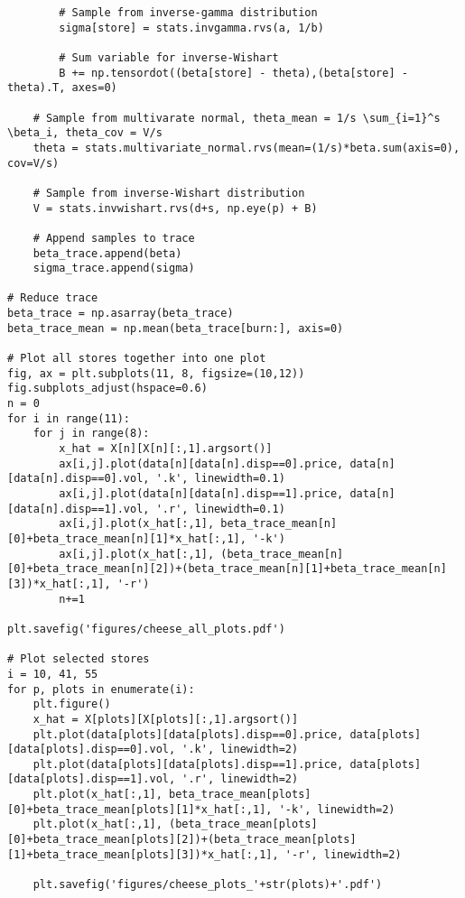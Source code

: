 \documentclass[11pt]{article}
\begin{document}
\begin{lstlisting}
        # Sample from inverse-gamma distribution
        sigma[store] = stats.invgamma.rvs(a, 1/b)
    
        # Sum variable for inverse-Wishart
        B += np.tensordot((beta[store] - theta),(beta[store] - theta).T, axes=0)

    # Sample from multivarate normal, theta_mean = 1/s \sum_{i=1}^s \beta_i, theta_cov = V/s
    theta = stats.multivariate_normal.rvs(mean=(1/s)*beta.sum(axis=0), cov=V/s)

    # Sample from inverse-Wishart distribution
    V = stats.invwishart.rvs(d+s, np.eye(p) + B)

    # Append samples to trace
    beta_trace.append(beta)
    sigma_trace.append(sigma)

# Reduce trace
beta_trace = np.asarray(beta_trace)
beta_trace_mean = np.mean(beta_trace[burn:], axis=0)

# Plot all stores together into one plot
fig, ax = plt.subplots(11, 8, figsize=(10,12))
fig.subplots_adjust(hspace=0.6)
n = 0
for i in range(11):
    for j in range(8):
        x_hat = X[n][X[n][:,1].argsort()]
        ax[i,j].plot(data[n][data[n].disp==0].price, data[n][data[n].disp==0].vol, '.k', linewidth=0.1)
        ax[i,j].plot(data[n][data[n].disp==1].price, data[n][data[n].disp==1].vol, '.r', linewidth=0.1)
        ax[i,j].plot(x_hat[:,1], beta_trace_mean[n][0]+beta_trace_mean[n][1]*x_hat[:,1], '-k')
        ax[i,j].plot(x_hat[:,1], (beta_trace_mean[n][0]+beta_trace_mean[n][2])+(beta_trace_mean[n][1]+beta_trace_mean[n][3])*x_hat[:,1], '-r')
        n+=1

plt.savefig('figures/cheese_all_plots.pdf')

# Plot selected stores
i = 10, 41, 55
for p, plots in enumerate(i):
    plt.figure()
    x_hat = X[plots][X[plots][:,1].argsort()]
    plt.plot(data[plots][data[plots].disp==0].price, data[plots][data[plots].disp==0].vol, '.k', linewidth=2)
    plt.plot(data[plots][data[plots].disp==1].price, data[plots][data[plots].disp==1].vol, '.r', linewidth=2)
    plt.plot(x_hat[:,1], beta_trace_mean[plots][0]+beta_trace_mean[plots][1]*x_hat[:,1], '-k', linewidth=2)
    plt.plot(x_hat[:,1], (beta_trace_mean[plots][0]+beta_trace_mean[plots][2])+(beta_trace_mean[plots][1]+beta_trace_mean[plots][3])*x_hat[:,1], '-r', linewidth=2)

    plt.savefig('figures/cheese_plots_'+str(plots)+'.pdf')
    \end{lstlisting}
\end{document}
